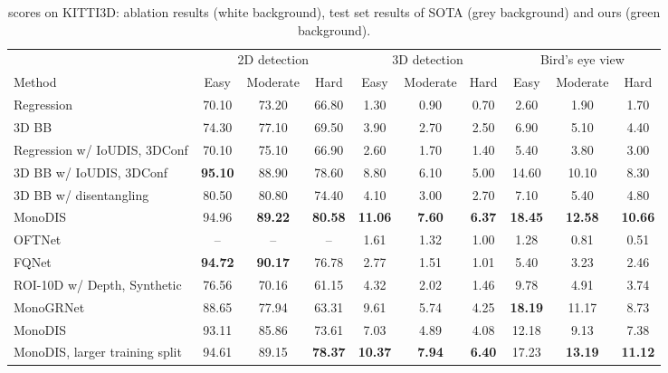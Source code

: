 \documentclass[10pt,twocolumn,letterpaper]{article}
\newcommand{\monodis}{MonoDIS}
\newcommand{\ioudis}{IoUDIS}
\newcommand{\confidence}{3DConf}
\begin{document}
\begin{table*}[t]
    \centering
    {\footnotesize
    \begin{tabular}{l|ccc|ccc|ccc}
        \toprule
        & \multicolumn{3}{c|}{2D detection} & \multicolumn{3}{c|}{3D detection} & \multicolumn{3}{c}{Bird's eye view} \\
        Method & Easy & Moderate & Hard & Easy & Moderate & Hard & Easy & Moderate & Hard \\
        \midrule
        Regression & 70.10 & 73.20 & 66.80 & 1.30 & 0.90 & 0.70 & 2.60 & 1.90 & 1.70 \\
        3D BB & 74.30 & 77.10 & 69.50 & 3.90 & 2.70 & 2.50 & 6.90 & 5.10 & 4.40 \\
        \midrule
        Regression w/ \ioudis, \confidence & 70.10 & 75.10 & 66.90 & 2.60 & 1.70 & 1.40 & 5.40 & 3.80 & 3.00 \\
        3D BB w/ \ioudis, \confidence & \textbf{95.10} & 88.90 & 78.60 & 8.80 & 6.10 & 5.00 & 14.60 & 10.10 & 8.30 \\
        3D BB w/ disentangling & 80.50 & 80.80 & 74.40 & 4.10 & 3.00 & 2.70 & 7.10 & 5.40 & 4.80 \\
        \rowcolor{mapillarygreen}
        \monodis & 94.96 & \textbf{89.22} & \textbf{80.58} & \textbf{11.06} & \textbf{7.60} & \textbf{6.37} & \textbf{18.45} & \textbf{12.58} & \textbf{10.66} \\
        \midrule
        \rowcolor[gray]{\gc}
        OFTNet~\cite{Roddick18} & -- & -- & -- & 1.61 & 1.32 & 1.00 & 1.28 & 0.81 & 0.51 \\
        \rowcolor[gray]{\gc}
        FQNet~\cite{Liu+19} & \textbf{94.72} & \textbf{90.17} & 76.78 & 2.77 & 1.51 & 1.01 & 5.40 & 3.23 & 2.46 \\
        \rowcolor[gray]{\gc}
        ROI-10D w/ Depth, Synthetic~\cite{Manhardt_2019_CVPR} & 76.56 & 70.16 & 61.15 & 4.32 & 2.02 & 1.46 & 9.78 & 4.91 & 3.74 \\
\rowcolor[gray]{\gc}
        MonoGRNet~\cite{qin2019monogrnet} & 88.65 & 77.94 & 63.31 & 9.61 & 5.74 & 4.25 & \textbf{18.19} & 11.17 & 8.73 \\
        \rowcolor{mapillarygreen}
        \monodis{} & 93.11 & 85.86 & 73.61 & 7.03 & 4.89 & 4.08 & 12.18 & 9.13 & 7.38 \\
        \rowcolor{mapillarygreen}
        \monodis{}, larger training split
        & 94.61 & 89.15 & \textbf{78.37} & \textbf{10.37} & \textbf{7.94} & \textbf{6.40} & 17.23 & \textbf{13.19} & \textbf{11.12} \\
        \bottomrule 
    \end{tabular}}
    \vspace{-0.5em}
    \caption{ scores on KITTI3D: ablation results (white background), test set results of SOTA (grey background) and ours (green background).}
    \label{tab:ablation-new-metric}
    \vspace{-0.5em}
\end{table*}
\end{document}
